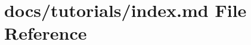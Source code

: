 \hypertarget{tutorials_2index_8md}{}\section{docs/tutorials/index.md File Reference}
\label{tutorials_2index_8md}
